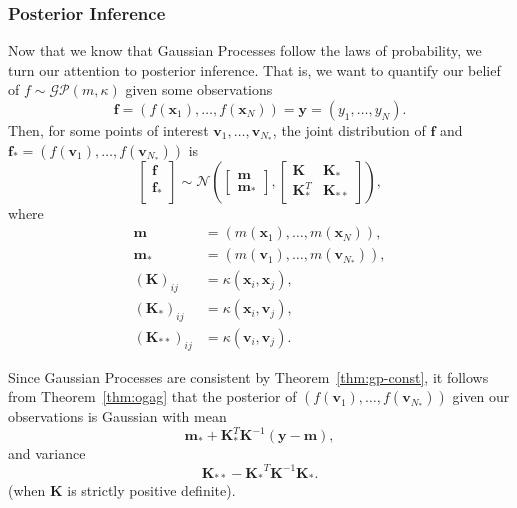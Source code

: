 \subsubsection{Posterior Inference}\label{sssec:post-inf}

Now that we know that Gaussian Processes follow the laws of probability, we turn our attention to posterior inference.
That is, we want to quantify our belief of $f \sim \mathcal{GP}(m, \kappa)$ given some observations
\begin{equation*}
    \mathbf{f} = (f(\mathbf{x}_1), \dots, f(\mathbf{x}_N)) = \mathbf{y} = (y_1, \dots, y_N).
\end{equation*}
Then, for some points of interest $\mathbf{v}_{1}, \dots, \mathbf{v}_{N_{*}}$, the joint distribution of $\mathbf{f}$ and $\mathbf{f}_* = (f(\mathbf{v}_1), \dots, f(\mathbf{v}_{N_*}))$ is
\begin{equation*}
    \begin{bmatrix}
        \mathbf{f} \\
        \mathbf{f}_{*} \\
    \end{bmatrix}
    \sim
    \mathcal{N}\left(
    \begin{bmatrix}
            \mathbf{m} \\
            \mathbf{m}_{*}
        \end{bmatrix}
    ,
    \begin{bmatrix}
            \mathbf{K} & \mathbf{K}_* \\
            \mathbf{K}_*^T & \mathbf{K}_{* *}
        \end{bmatrix}
    \right),
\end{equation*}
where
\begin{align*}
    \mathbf{m} & = (m(\mathbf{x}_1), \dots, m(\mathbf{x}_N)), \\
    \mathbf{m_*} & = (m(\mathbf{v}_1), \dots, m(\mathbf{v}_{N_{*}})), \\
    (\mathbf{K})_{ij} & = \kappa(\mathbf{x}_i, \mathbf{x}_j), \\
    (\mathbf{K}_*)_{ij} & = \kappa(\mathbf{x}_i, \mathbf{v}_j), \\
    (\mathbf{K}_{* *})_{ij} & = \kappa(\mathbf{v}_i, \mathbf{v}_j).
\end{align*}

Since Gaussian Processes are consistent by Theorem~\ref{thm:gp-const}, it follows from Theorem~\ref{thm:ogag} that the posterior
of $(f(\mathbf{v}_1), \dots, f(\mathbf{v}_{N_*}))$ given our observations is Gaussian with mean
\begin{equation}
    \label{eq:noisless-post-mean}
    \mathbf{m}_* + \mathbf{K}_*^T \mathbf{K}^{-1} (\mathbf{y} - \mathbf{m}),
\end{equation}
and variance
\begin{equation}
    \label{eq:noiseless-post-var}
    \mathbf{K}_{* *} - \mathbf{K_*}^{T} \mathbf{K}^{-1} \mathbf{K_*}.
\end{equation}
(when $\mathbf{K}$ is strictly positive definite).

